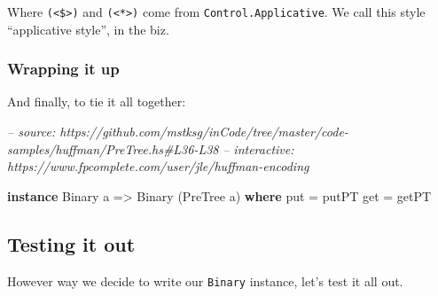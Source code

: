 \documentclass[]{article}
\newenvironment{Shaded}{}{}
\newcommand{\CommentTok}[1]{\textcolor[rgb]{0.38,0.63,0.69}{\textit{#1}}}
\newcommand{\DataTypeTok}[1]{\textcolor[rgb]{0.56,0.13,0.00}{#1}}
\newcommand{\FunctionTok}[1]{\textcolor[rgb]{0.02,0.16,0.49}{#1}}
\newcommand{\KeywordTok}[1]{\textcolor[rgb]{0.00,0.44,0.13}{\textbf{#1}}}
\newcommand{\NormalTok}[1]{#1}
\newcommand{\OtherTok}[1]{\textcolor[rgb]{0.00,0.44,0.13}{#1}}
\begin{document}
Where \texttt{(\textless{}\$\textgreater{})} and
\texttt{(\textless{}*\textgreater{})} come from \texttt{Control.Applicative}. We
call this style ``applicative style'', in the biz.

\hypertarget{wrapping-it-up}{%
\subsubsection{Wrapping it up}\label{wrapping-it-up}}

And finally, to tie it all together:

\begin{Shaded}
\begin{Highlighting}[]
\CommentTok{-- source: https://github.com/mstksg/inCode/tree/master/code-samples/huffman/PreTree.hs#L36-L38}
\CommentTok{-- interactive: https://www.fpcomplete.com/user/jle/huffman-encoding}

\KeywordTok{instance} \DataTypeTok{Binary}\NormalTok{ a }\OtherTok{=>} \DataTypeTok{Binary}\NormalTok{ (}\DataTypeTok{PreTree}\NormalTok{ a) }\KeywordTok{where}
\NormalTok{    put }\FunctionTok{=}\NormalTok{ putPT}
\NormalTok{    get }\FunctionTok{=}\NormalTok{ getPT}
\end{Highlighting}
\end{Shaded}

\hypertarget{testing-it-out}{%
\subsection{Testing it out}\label{testing-it-out}}

However way we decide to write our \texttt{Binary} instance, let's test it all
out.
\end{document}
